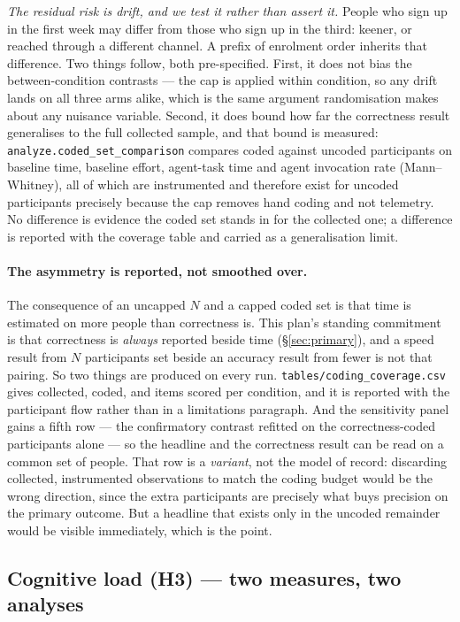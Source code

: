 \documentclass[11pt]{article}
\newcommand{\code}[1]{\texttt{#1}}
\begin{document}
\emph{The residual risk is drift, and we test it rather than assert it.} People
who sign up in the first week may differ from those who sign up in the third:
keener, or reached through a different channel. A prefix of enrolment order
inherits that difference. Two things follow, both pre-specified. First, it does
not bias the between-condition contrasts --- the cap is applied within condition,
so any drift lands on all three arms alike, which is the same argument
randomisation makes about any nuisance variable. Second, it does bound how far
the correctness result generalises to the full collected sample, and that bound
is measured: \code{analyze.coded\_set\_comparison} compares coded against uncoded
participants on baseline time, baseline effort, agent-task time and agent
invocation rate (Mann--Whitney), all of which are instrumented and therefore
exist for uncoded participants precisely because the cap removes hand coding and
not telemetry. No difference is evidence the coded set stands in for the
collected one; a difference is reported with the coverage table and carried as a
generalisation limit.

\paragraph{The asymmetry is reported, not smoothed over.} The consequence of an
uncapped $N$ and a capped coded set is that time is estimated on more people than
correctness is. This plan's standing commitment is that correctness is
\emph{always} reported beside time (\S\ref{sec:primary}), and a speed result from
$N$ participants set beside an accuracy result from fewer is not that pairing. So
two things are produced on every run. \code{tables/coding\_coverage.csv} gives
collected, coded, and items scored per condition, and it is reported with the
participant flow rather than in a limitations paragraph. And the sensitivity
panel gains a fifth row --- the confirmatory contrast refitted on the
correctness-coded participants alone --- so the headline and the correctness
result can be read on a common set of people. That row is a \emph{variant}, not
the model of record: discarding collected, instrumented observations to match the
coding budget would be the wrong direction, since the extra participants are
precisely what buys precision on the primary outcome. But a headline that exists
only in the uncoded remainder would be visible immediately, which is the point.

\subsection{Cognitive load (H3) --- two measures, two analyses}
\end{document}
